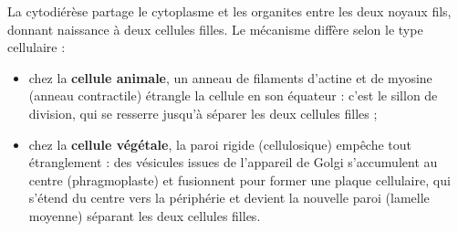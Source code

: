 \documentclass[11pt]{article}
\newcommand{\cle}[1]{{\popxbold\color{popdark}#1}}
\begin{document}
La cytodiérèse partage le cytoplasme et les organites entre les deux noyaux fils, donnant naissance à deux cellules filles. Le mécanisme diffère selon le type cellulaire :
\begin{itemize}
\item chez la \textbf{cellule animale}, un anneau de filaments d'actine et de myosine (anneau contractile) étrangle la cellule en son équateur : c'est le \cle{sillon de division}, qui se resserre jusqu'à séparer les deux cellules filles ;
\item chez la \textbf{cellule végétale}, la paroi rigide (cellulosique) empêche tout étranglement : des vésicules issues de l'appareil de Golgi s'accumulent au centre (phragmoplaste) et fusionnent pour former une \cle{plaque cellulaire}, qui s'étend du centre vers la périphérie et devient la nouvelle paroi (lamelle moyenne) séparant les deux cellules filles.
\end{itemize}
\end{document}
